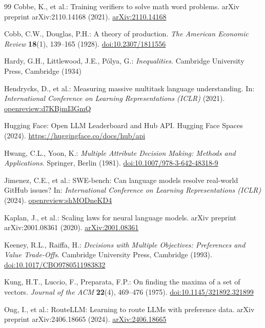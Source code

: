 \documentclass[pdflatex,sn-mathphys-num]{sn-jnl}
\theoremstyle{thmstyleone}
\theoremstyle{thmstylethree}
\begin{document}
\begin{thebibliography}{99}
Cobbe, K., et al.: Training verifiers to solve math word problems. arXiv preprint arXiv:2110.14168 (2021). \href{https://arxiv.org/abs/2110.14168}{arXiv:2110.14168}

Cobb, C.W., Douglas, P.H.: A theory of production. \emph{The American Economic Review} \textbf{18}(1), 139--165 (1928). \href{https://doi.org/10.2307/1811556}{doi:10.2307/1811556}

Hardy, G.H., Littlewood, J.E., P\'olya, G.: \emph{Inequalities}. Cambridge University Press, Cambridge (1934)

Hendrycks, D., et al.: Measuring massive multitask language understanding. In: \emph{International Conference on Learning Representations (ICLR)} (2021). \href{https://openreview.net/forum?id=d7KBjmI3GmQ}{openreview:d7KBjmI3GmQ}

Hugging Face: Open LLM Leaderboard and Hub API. Hugging Face Spaces (2024). \href{https://huggingface.co/docs/hub/api}{https://huggingface.co/docs/hub/api}

Hwang, C.L., Yoon, K.: \emph{Multiple Attribute Decision Making: Methods and Applications}. Springer, Berlin (1981). \href{https://doi.org/10.1007/978-3-642-48318-9}{doi:10.1007/978-3-642-48318-9}

Jimenez, C.E., et al.: SWE-bench: Can language models resolve real-world GitHub issues? In: \emph{International Conference on Learning Representations (ICLR)} (2024). \href{https://openreview.net/forum?id=shMODneKD4}{openreview:shMODneKD4}

Kaplan, J., et al.: Scaling laws for neural language models. arXiv preprint arXiv:2001.08361 (2020). \href{https://arxiv.org/abs/2001.08361}{arXiv:2001.08361}

Keeney, R.L., Raiffa, H.: \emph{Decisions with Multiple Objectives: Preferences and Value Trade-Offs}. Cambridge University Press, Cambridge (1993). \href{https://doi.org/10.1017/CBO9780511983832}{doi:10.1017/CBO9780511983832}

Kung, H.T., Luccio, F., Preparata, F.P.: On finding the maxima of a set of vectors. \emph{Journal of the ACM} \textbf{22}(4), 469--476 (1975). \href{https://doi.org/10.1145/321892.321899}{doi:10.1145/321892.321899}

Ong, I., et al.: RouteLLM: Learning to route LLMs with preference data. arXiv preprint arXiv:2406.18665 (2024). \href{https://arxiv.org/abs/2406.18665}{arXiv:2406.18665}


\end{thebibliography}
\end{document}
